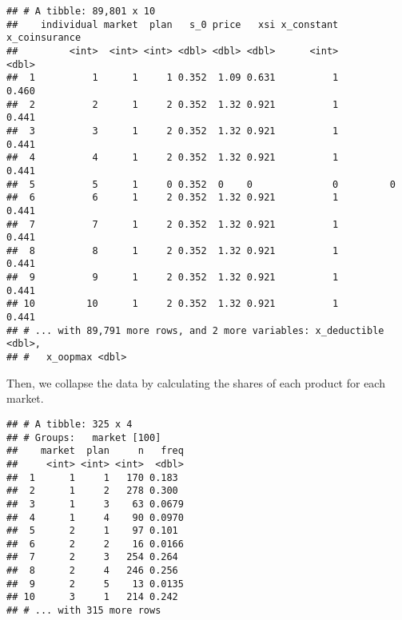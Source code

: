 \documentclass[]{article}
\newenvironment{Shaded}{\begin{snugshade}}{\end{snugshade}}
\newcommand{\DataTypeTok}[1]{\textcolor[rgb]{0.13,0.29,0.53}{#1}}
\newcommand{\DecValTok}[1]{\textcolor[rgb]{0.00,0.00,0.81}{#1}}
\newcommand{\KeywordTok}[1]{\textcolor[rgb]{0.13,0.29,0.53}{\textbf{#1}}}
\newcommand{\NormalTok}[1]{#1}
\newcommand{\OperatorTok}[1]{\textcolor[rgb]{0.81,0.36,0.00}{\textbf{#1}}}
\newcommand{\StringTok}[1]{\textcolor[rgb]{0.31,0.60,0.02}{#1}}
\begin{document}
\begin{verbatim}
## # A tibble: 89,801 x 10
##    individual market  plan   s_0 price   xsi x_constant x_coinsurance
##         <int>  <int> <int> <dbl> <dbl> <dbl>      <int>         <dbl>
##  1          1      1     1 0.352  1.09 0.631          1         0.460
##  2          2      1     2 0.352  1.32 0.921          1         0.441
##  3          3      1     2 0.352  1.32 0.921          1         0.441
##  4          4      1     2 0.352  1.32 0.921          1         0.441
##  5          5      1     0 0.352  0    0              0         0    
##  6          6      1     2 0.352  1.32 0.921          1         0.441
##  7          7      1     2 0.352  1.32 0.921          1         0.441
##  8          8      1     2 0.352  1.32 0.921          1         0.441
##  9          9      1     2 0.352  1.32 0.921          1         0.441
## 10         10      1     2 0.352  1.32 0.921          1         0.441
## # ... with 89,791 more rows, and 2 more variables: x_deductible <dbl>,
## #   x_oopmax <dbl>
\end{verbatim}

Then, we collapse the data by calculating the shares of each product for
each market.

\begin{Shaded}
\end{Shaded}

\begin{verbatim}
## # A tibble: 325 x 4
## # Groups:   market [100]
##    market  plan     n   freq
##     <int> <int> <int>  <dbl>
##  1      1     1   170 0.183 
##  2      1     2   278 0.300 
##  3      1     3    63 0.0679
##  4      1     4    90 0.0970
##  5      2     1    97 0.101 
##  6      2     2    16 0.0166
##  7      2     3   254 0.264 
##  8      2     4   246 0.256 
##  9      2     5    13 0.0135
## 10      3     1   214 0.242 
## # ... with 315 more rows
\end{verbatim}
\end{document}
